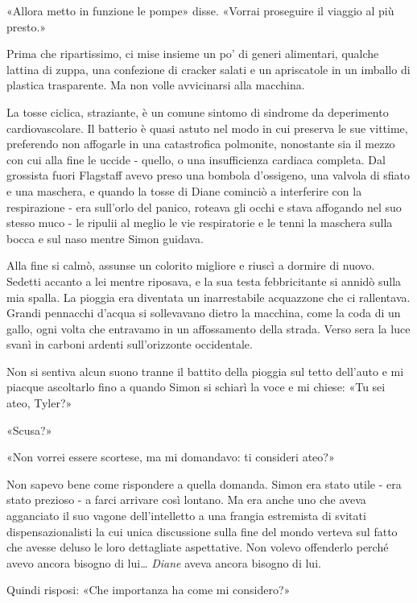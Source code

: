 «Allora metto in funzione le pompe» disse. «Vorrai proseguire il viaggio
al più presto.»

Prima che ripartissimo, ci mise insieme un po' di generi alimentari,
qualche lattina di zuppa, una confezione di cracker salati e un
apriscatole in un imballo di plastica trasparente. Ma non volle
avvicinarsi alla macchina.

\separatorefiori

La tosse ciclica, straziante, è un comune sintomo di sindrome da
deperimento cardiovascolare. Il batterio è quasi astuto nel modo in cui
preserva le sue vittime, preferendo non affogarle in una catastrofica
polmonite, nonostante sia il mezzo con cui alla fine le uccide - quello,
o una insufficienza cardiaca completa. Dal grossista fuori Flagstaff
avevo preso una bombola d'ossigeno, una valvola di sfiato e una
maschera, e quando la tosse di Diane cominciò a interferire con la
respirazione - era sull'orlo del panico, roteava gli occhi e stava
affogando nel suo stesso muco - le ripulii al meglio le vie respiratorie
e le tenni la maschera sulla bocca e sul naso mentre Simon guidava.

Alla fine si calmò, assunse un colorito migliore e riuscì a dormire di
nuovo. Sedetti accanto a lei mentre riposava, e la sua testa
febbricitante si annidò sulla mia spalla. La pioggia era diventata un
inarrestabile acquazzone che ci rallentava. Grandi pennacchi d'acqua si
sollevavano dietro la macchina, come la coda di un gallo, ogni volta che
entravamo in un affossamento della strada. Verso sera la luce svanì in
carboni ardenti sull'orizzonte occidentale.

Non si sentiva alcun suono tranne il battito della pioggia sul tetto
dell'auto e mi piacque ascoltarlo fino a quando Simon si schiarì la voce
e mi chiese: «Tu sei ateo, Tyler?»

«Scusa?»

«Non vorrei essere scortese, ma mi domandavo: ti consideri ateo?»

Non sapevo bene come rispondere a quella domanda. Simon era stato utile
- era stato prezioso - a farci arrivare così lontano. Ma era anche uno
che aveva agganciato il suo vagone dell'intelletto a una frangia
estremista di svitati dispensazionalisti la cui unica discussione sulla
fine del mondo verteva sul fatto che avesse deluso le loro dettagliate
aspettative. Non volevo offenderlo perché avevo ancora bisogno di
lui\ldots{} \emph{Diane} aveva ancora bisogno di lui.

Quindi risposi: «Che importanza ha come mi considero?»

